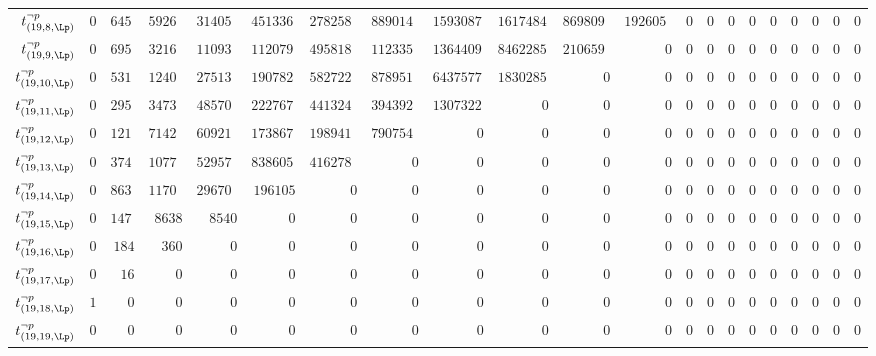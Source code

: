\begin{tabular}{r|rrrrrrrrrrrrrrrrrrrr}
  $t^{\neg p}_{(19,8,\Lp)}$ & $0$ & $645829$ & $592640612$ & $31405871979$ & $451336771186$ & $2782587743570$ & $8890141683492$ & $15930877535384$ & $16174843721404$ & $8698098340935$ & $1926055788030$ & $0$ & $0$ & $0$ & $0$ & $0$ & $0$ & $0$ & $0$ & $0$ \\
  $t^{\neg p}_{(19,9,\Lp)}$ & $0$ & $695287$ & $321653166$ & $11093875366$ & $112079831552$ & $495818444275$ & $1123351619858$ & $1364409832212$ & $846228594936$ & $210659363110$ & $0$ & $0$ & $0$ & $0$ & $0$ & $0$ & $0$ & $0$ & $0$ & $0$ \\
  $t^{\neg p}_{(19,10,\Lp)}$ & $0$ & $531197$ & $124037066$ & $2751328605$ & $19078252093$ & $58272222710$ & $87895117572$ & $64375772545$ & $18302851125$ & $0$ & $0$ & $0$ & $0$ & $0$ & $0$ & $0$ & $0$ & $0$ & $0$ & $0$ \\
  $t^{\neg p}_{(19,11,\Lp)}$ & $0$ & $295478$ & $34732538$ & $485701377$ & $2227671256$ & $4413243715$ & $3943925460$ & $1307322192$ & $0$ & $0$ & $0$ & $0$ & $0$ & $0$ & $0$ & $0$ & $0$ & $0$ & $0$ & $0$ \\
  $t^{\neg p}_{(19,12,\Lp)}$ & $0$ & $121750$ & $7142180$ & $60921979$ & $173867888$ & $198941145$ & $79075458$ & $0$ & $0$ & $0$ & $0$ & $0$ & $0$ & $0$ & $0$ & $0$ & $0$ & $0$ & $0$ & $0$ \\
  $t^{\neg p}_{(19,13,\Lp)}$ & $0$ & $37472$ & $1077512$ & $5295723$ & $8386052$ & $4162782$ & $0$ & $0$ & $0$ & $0$ & $0$ & $0$ & $0$ & $0$ & $0$ & $0$ & $0$ & $0$ & $0$ & $0$ \\
  $t^{\neg p}_{(19,14,\Lp)}$ & $0$ & $8631$ & $117014$ & $296709$ & $196105$ & $0$ & $0$ & $0$ & $0$ & $0$ & $0$ & $0$ & $0$ & $0$ & $0$ & $0$ & $0$ & $0$ & $0$ & $0$ \\
  $t^{\neg p}_{(19,15,\Lp)}$ & $0$ & $1474$ & $8638$ & $8540$ & $0$ & $0$ & $0$ & $0$ & $0$ & $0$ & $0$ & $0$ & $0$ & $0$ & $0$ & $0$ & $0$ & $0$ & $0$ & $0$ \\
  $t^{\neg p}_{(19,16,\Lp)}$ & $0$ & $184$ & $360$ & $0$ & $0$ & $0$ & $0$ & $0$ & $0$ & $0$ & $0$ & $0$ & $0$ & $0$ & $0$ & $0$ & $0$ & $0$ & $0$ & $0$ \\
  $t^{\neg p}_{(19,17,\Lp)}$ & $0$ & $16$ & $0$ & $0$ & $0$ & $0$ & $0$ & $0$ & $0$ & $0$ & $0$ & $0$ & $0$ & $0$ & $0$ & $0$ & $0$ & $0$ & $0$ & $0$ \\
  $t^{\neg p}_{(19,18,\Lp)}$ & $1$ & $0$ & $0$ & $0$ & $0$ & $0$ & $0$ & $0$ & $0$ & $0$ & $0$ & $0$ & $0$ & $0$ & $0$ & $0$ & $0$ & $0$ & $0$ & $0$ \\
  $t^{\neg p}_{(19,19,\Lp)}$ & $0$ & $0$ & $0$ & $0$ & $0$ & $0$ & $0$ & $0$ & $0$ & $0$ & $0$ & $0$ & $0$ & $0$ & $0$ & $0$ & $0$ & $0$ & $0$ & $0$ \\
\end{tabular}
